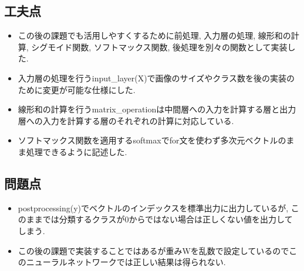 \documentclass[a4j, titlepage]{jarticle}
\begin{document}
\subsection*{工夫点}
    \begin{itemize}
        \item  この後の課題でも活用しやすくするために前処理, 入力層の処理, 線形和の計算, シグモイド関数, ソフトマックス関数, 後処理を別々の関数として実装した.
        \item 入力層の処理を行うinput\_layer(X)で画像のサイズやクラス数を後の実装のために変更が可能な仕様にした.
        \item 線形和の計算を行うmatrix\_operationは中間層への入力を計算する層と出力層への入力を計算する層のそれぞれの計算に対応している.
        \item ソフトマックス関数を適用するsoftmaxでfor文を使わず多次元ベクトルのまま処理できるように記述した.
    \end{itemize}
\subsection*{問題点}
    \begin{itemize}
        \item  postprocessing(y)でベクトルのインデックスを標準出力に出力しているが, このままでは分類するクラスが0からではない場合は正しくない値を出力してしまう.
        \item この後の課題で実装することではあるが重みWを乱数で設定しているのでこのニューラルネットワークでは正しい結果は得られない.
    \end{itemize}
\end{document}
